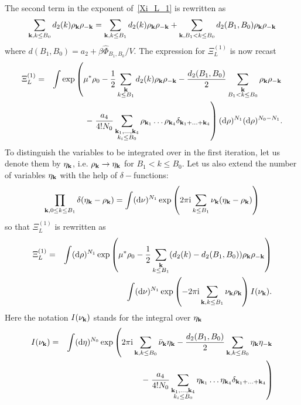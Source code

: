 The second term in the exponent of~\eqref{Xi_L_1} is rewritten as
\begin{equation*}
	\sum_{\substack{\vb k, k \leq B_0}} d_2(k) \rho_{\vb k} \rho_{-\vb k} 
	= 
	\sum_{\substack{\vb k, k \leq B_1}} d_2(k) \rho_{\vb k} \rho_{-\vb k}
	+
	\sum_{\substack{\vb k, B_1 < k \leq B_0}} d_2(B_1, B_0) \rho_{\vb k} \rho_{-\vb k}
\end{equation*}
where $d(B_1, B_0) = a_2 + \beta\hat{\Phi}_{B_1, B_0}/V$.
The expression for $\Xi_L^{(1)}$ is now recast
\begin{eqnarray*}
	\Xi_L^{(1)} &=& 
	\int \exp\left(
	\mu^* \rho_0 - \frac{1}{2} \sum_{\substack{\vb k \\ k \leq B_1}} d_2(k) \rho_{\vb k} \rho_{-\vb k}
	- \frac{d_2(B_1, B_0)}{2} \sum_{\substack{\vb k \\ B_1 < k \leq B_0}} \rho_{\vb k} \rho_{-\vb k}  
	\right.
	\\
	&& -\left. \frac{a_4}{4! N_0} \sum_{\substack{\vb k_1, \dotsc, \vb k_4 \\ k_i \leq B_0}} \rho_{\vb k_1} \dotsc \rho_{\vb k_4} \delta_{\vb{k}_1 + \dotsc + \vb{k}_4} \right) 
	({\rm d} \rho)^{N_1} ({\rm d} \rho)^{N_0 - N_1}
	\nonumber.
\end{eqnarray*}
To distinguish the variables to be integrated over in the first iteration, let us denote them by $\eta_{\vb k}$, i.e. $\rho_{\vb k} \rightarrow \eta_{\vb k}$ for $B_1 < k \leq B_0$. Let us also extend the number of variables $\eta_{\vb k}$ with the help of $\delta-$functions:
\begin{equation*}
	\prod_{\vb{k}, 0\leq k \leq B_1}\delta(\eta_{\vb k}-\rho_{\vb k})
	= \int ({\rm d}\nu)^{N_1}\exp \left(2\pi{\rm i}\sum_{k\leq B_1}\nu_{\vb k}(\eta_{\vb k}-\rho_{\vb k})\right)
\end{equation*}
so that $\Xi_L^{(1)}$ is rewritten as 
\begin{eqnarray*}
	\Xi_L^{(1)} &=& 
	\int ({\rm d} \rho)^{N_1} \exp 
	\left(
		\mu^* \rho_0 - \frac{1}{2} \sum_{\substack{\vb k \\ k \leq B_1}} (d_2(k) - d_2(B_1, B_0) ) \rho_{\vb k} \rho_{-\vb k}
	\right)
	\\
	&&  \int ({\rm d}\nu)^{N_1} \exp \left(-2\pi{\rm i}\sum_{\vb k, k \leq B_1} \nu_{\vb k}\rho_{\vb k}\right)
	I(\nu_{\vb k}).
\end{eqnarray*}
Here the notation $I(\nu_{\vb k})$ stands for the integral over $\eta_{\vb k}$
\begin{eqnarray*}
	I(\nu_{\vb k}) & = & \int ({\rm d} \eta)^{N_0} \exp
	\left( 2\pi{\rm i} \sum_{\vb k, k \leq B_0} \bar{\nu}_{\vb k} \eta_{\vb k} - \frac{d_2(B_1, B_0)}{2} \sum_{\vb k, k \leq B_0} \eta_{\vb k} \eta_{-\vb k}
	\right.
	\\
	&& - \left. \frac{a_4}{4! N_0} \sum_{\substack{\vb k_1, \dotsc, \vb k_4 \\ k_i \leq B_0}} \eta_{\vb k_1} \dotsc \eta_{\vb k_4} \delta_{\vb{k}_1 + \dotsc + \vb{k}_4} \right)
\end{eqnarray*}
